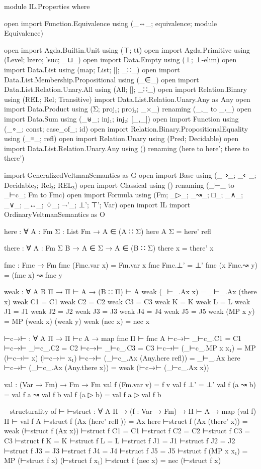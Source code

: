 \begin{spverbatim}
module IL.Properties where

open import Function.Equivalence using (_⇔_; equivalence; module Equivalence)

open import Agda.Builtin.Unit using (⊤; tt)
open import Agda.Primitive using (Level; lzero; lsuc; _⊔_)
open import Data.Empty using (⊥; ⊥-elim)
open import Data.List using (map; List; []; _∷_)
open import Data.List.Membership.Propositional using (_∈_)
open import Data.List.Relation.Unary.All using (All; []; _∷_)
open import Relation.Binary using (REL; Rel; Transitive)
import Data.List.Relation.Unary.Any as Any
open import Data.Product using (Σ; proj₁; proj₂; _×_) renaming (_,_ to _⸴_)
open import Data.Sum using (_⊎_; inj₁; inj₂; [_,_])
open import Function using (_∘_; const; case_of_; id)
open import Relation.Binary.PropositionalEquality using (_≡_; refl)
open import Relation.Unary using (Pred; Decidable)
open import Data.List.Relation.Unary.Any using () renaming (here to here'; there to there')

import GeneralizedVeltmanSemantics as G
open import Base using (_⇒_; _⇐_; Decidable₃; Rel₃; REL₃)
open import Classical using () renaming (_⊢_ to _⊢c_; Fm to Fmc)
open import Formula using (Fm; _▷_; _↝_; □_; _∧_; _∨_; _↔_; ♢_; ¬'_; ⊥'; ⊤'; Var)
open import IL
import OrdinaryVeltmanSemantics as O

here : ∀ {A : Fm} {Σ : List Fm} → A ∈ (A ∷ Σ)
here {A} {Σ} = here' refl

there : ∀ {A : Fm} {Σ B} → A ∈ Σ → A ∈ (B ∷ Σ)
there x = there' x

fmc : Fmc → Fm
fmc (Fmc.var x) = Fm.var x
fmc Fmc.⊥' = ⊥'
fmc (x Fmc.↝ y) = (fmc x) ↝ fmc y

weak : ∀ {A B Π} → Π ⊢ A → (B ∷ Π) ⊢ A
weak (_⊢_.Ax x) = _⊢_.Ax (there x)
weak C1 = C1
weak C2 = C2
weak C3 = C3
weak K = K
weak L = L
weak J1 = J1
weak J2 = J2
weak J3 = J3
weak J4 = J4
weak J5 = J5
weak (MP x y) = MP (weak x) (weak y)
weak (nec x) = nec x

⊢c→⊢ : ∀ {A Π} → Π ⊢c A → map fmc Π ⊢ fmc A
⊢c→⊢ _⊢c_.C1 = C1
⊢c→⊢ _⊢c_.C2 = C2
⊢c→⊢ _⊢c_.C3 = C3
⊢c→⊢ (_⊢c_.MP x x₁) = MP (⊢c→⊢ x) (⊢c→⊢ x₁)
⊢c→⊢ (_⊢c_.Ax (Any.here refl)) = _⊢_.Ax here
⊢c→⊢ (_⊢c_.Ax (Any.there x)) = weak (⊢c→⊢ (_⊢c_.Ax x))

val : (Var → Fm) → Fm → Fm
val f (Fm.var v) = f v
val f ⊥' = ⊥'
val f (a ↝ b) = val f a ↝ val f b
val f (a ▷ b) = val f a ▷ val f b

-- structurality of ⊢
⊢struct : ∀ {A Π} → (f : Var → Fm) → Π ⊢ A → map (val f) Π ⊢ val f A
⊢struct f (Ax (here' refl )) = Ax here
⊢struct f (Ax (there' x)) = weak (⊢struct f (Ax x))
⊢struct f C1 = C1
⊢struct f C2 = C2
⊢struct f C3 = C3
⊢struct f K = K
⊢struct f L = L
⊢struct f J1 = J1
⊢struct f J2 = J2
⊢struct f J3 = J3
⊢struct f J4 = J4
⊢struct f J5 = J5
⊢struct f (MP x x₁) = MP (⊢struct f x) (⊢struct f x₁)
⊢struct f (nec x) = nec (⊢struct f x)


\end{spverbatim}
